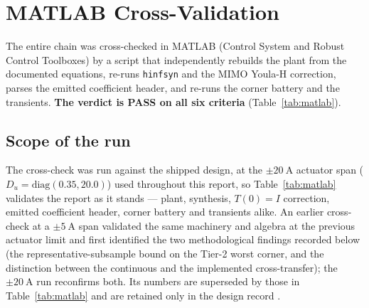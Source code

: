 \documentclass[energies,article,submit,pdftex,oneauthor]{Definitions/mdpi}
\begin{document}
\section{MATLAB Cross-Validation}
\label{app:matlab}

The entire chain was cross-checked in MATLAB (Control System and Robust Control Toolboxes) by a
script that independently rebuilds the plant from the documented equations, re-runs
\texttt{hinfsyn} and the MIMO Youla-H correction, parses the emitted coefficient header, and
re-runs the corner battery and the transients. \textbf{The verdict is PASS on all six criteria}
(Table~\ref{tab:matlab}).

\subsection{Scope of the run}
The cross-check was run against the shipped design, at the $\pm\SI{20}{\ampere}$ actuator span
($D_u = \mathrm{diag}(0.35, 20.0)$) used throughout this report, so Table~\ref{tab:matlab}
validates the report as it stands --- plant, synthesis, $T(0)=I$ correction, emitted
coefficient header, corner battery and transients alike. An earlier cross-check at a
$\pm\SI{5}{\ampere}$ span validated the same machinery and algebra at the previous actuator
limit and first identified the two methodological findings recorded below (the
representative-subsample bound on the Tier-2 worst corner, and the distinction between the
continuous and the implemented cross-transfer); the $\pm\SI{20}{\ampere}$ run reconfirms both.
Its numbers are superseded by those in Table~\ref{tab:matlab} and are retained only in the
design record \citep{internal:mimo-cmp}.
\end{document}

